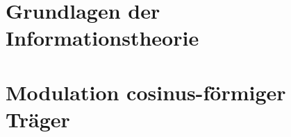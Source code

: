 \newpage
\section{Grundlagen der Informationstheorie} 
	
\section{Modulation cosinus-förmiger Träger}
	